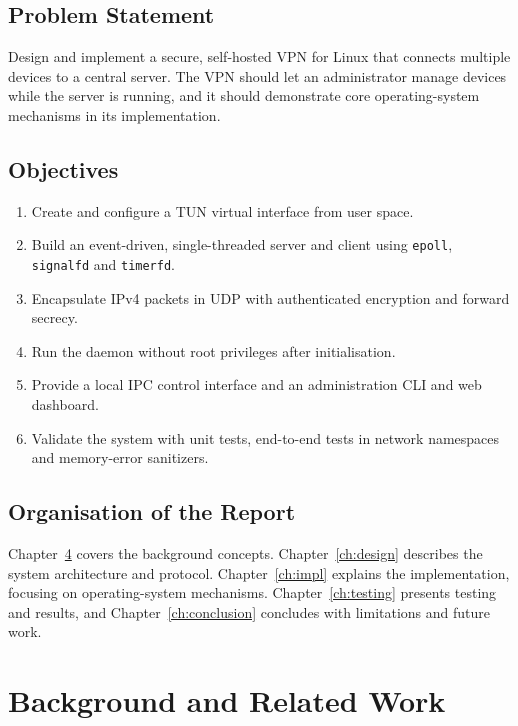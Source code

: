 \documentclass[12pt,a4paper]{report}
\begin{document}
\section{Problem Statement}
Design and implement a secure, self-hosted VPN for Linux that connects multiple
devices to a central server. The VPN should let an administrator manage devices while
the server is running, and it should demonstrate core operating-system mechanisms in
its implementation.

\section{Objectives}
\begin{enumerate}
  \item Create and configure a TUN virtual interface from user space.
  \item Build an event-driven, single-threaded server and client using \texttt{epoll},
        \texttt{signalfd} and \texttt{timerfd}.
  \item Encapsulate IPv4 packets in UDP with authenticated encryption and forward secrecy.
  \item Run the daemon without root privileges after initialisation.
  \item Provide a local IPC control interface and an administration CLI and web dashboard.
  \item Validate the system with unit tests, end-to-end tests in network namespaces and
        memory-error sanitizers.
\end{enumerate}

\section{Organisation of the Report}
Chapter~\ref{ch:background} covers the background concepts. Chapter~\ref{ch:design}
describes the system architecture and protocol. Chapter~\ref{ch:impl} explains the
implementation, focusing on operating-system mechanisms. Chapter~\ref{ch:testing}
presents testing and results, and Chapter~\ref{ch:conclusion} concludes with
limitations and future work.

\chapter{Background and Related Work}\label{ch:background}
\end{document}
